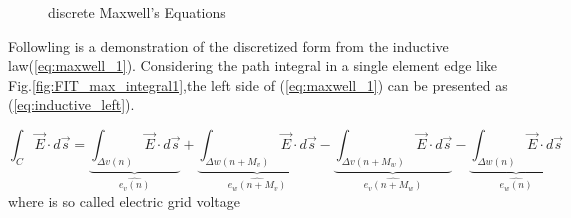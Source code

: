 

\begin{figure}
\centering
{}
\hfill
{}
\caption{discrete Maxwell's Equations}
\end{figure}

Followling is a demonstration of the discretized form from the  inductive law(\ref{eq:maxwell_1}). Considering the path integral in a single element edge like Fig.\ref{fig:FIT_max_integral1},the left side of (\ref{eq:maxwell_1}) can be presented as (\ref{eq:inductive_left}). 

\begin{equation}
\int_{C}\vec{E}\cdot d\vec{s}
=\underbrace{\int_{\Delta v(n)}\vec{E}\cdot d\vec{s}}_{\widehat{e_{v}(n)}}
+\underbrace{\int_{\Delta w(n+M_{v})}\vec{E}\cdot d\vec{s}}_{\widehat{e_{w}(n+M_{v})}}
-\underbrace{\int_{\Delta v(n+M_{w})}\vec{E}\cdot d\vec{s}}_{\widehat{e_{v}(n+M_{w})}}
-\underbrace{\int_{\Delta w(n)}\vec{E}\cdot d\vec{s}}_{\widehat{e_{w}(n)}}
\label{eq:inductive_left}
\end{equation}
where  is so called  electric grid voltage

